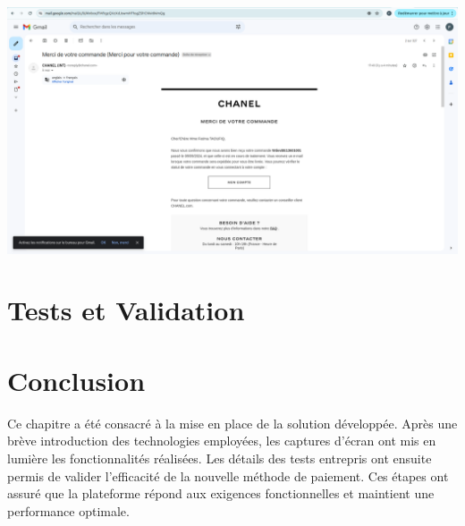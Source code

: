 \begin{center}
    \centering
    \includegraphics[width=19cm]{Figures/Screens/confirmation par mail.png}
    \label{fig:email}
\end{center}




















\section{Tests et Validation}


\section*{Conclusion}
Ce chapitre a été consacré à la mise en place de la solution développée. Après une brève introduction des technologies employées, les captures d'écran ont mis en lumière les fonctionnalités réalisées. Les détails des tests entrepris ont ensuite permis de valider l'efficacité de la nouvelle méthode de paiement. Ces étapes ont assuré que la plateforme répond aux exigences fonctionnelles et maintient une performance optimale.


